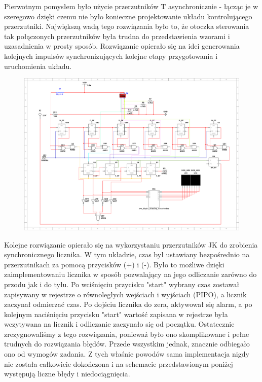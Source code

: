 \documentclass[a4paper]{article}
\begin{document}
Pierwotnym pomysłem było użycie przerzutników T asynchronicznie - łącząc je w szeregowo dzięki czemu 
nie było konieczne projektowanie układu kontrolującego przerzutniki. Największą wadą tego rozwiązania
było to, że otoczka sterowania tak połączonych przerzutników była trudna do przedstawienia wzorami i 
uzasadnienia w prosty sposób. Rozwiązanie opierało się na idei generowania kolejnych impulsów 
synchronizujących kolejne etapy przygotowania i uruchomienia układu.

\begin{figure}[H]
    \centering
    \includegraphics[width=\textwidth]{lab2_1.pdf}
\end{figure}
\pagebreak

Kolejne rozwiązanie opierało się na wykorzystaniu przerzutników JK do zrobienia synchronicznego licznika.
W tym układzie, czas był ustawiany bezpośrednio na przerzutnikach za pomocą przycisków (+) i (-). Było to możliwe
dzięki zaimplementowaniu licznika w sposób pozwalający na jego odliczanie zarówno do przodu jak i do tyłu.
Po wciśnięciu przycisku "start" wybrany czas zostawał zapisywany w rejestrze o równoległych wejściach i wyjściach (PIPO),
a licznik zaczynał odmierzać czas. Po dojściu licznika do zera, aktywował się alarm, a po kolejnym naciśnięciu
przycisku "start" wartość zapisana w rejestrze była wczytywana na licznik i odliczanie zaczynało się od początku.
Ostatecznie zrezygnowaliśmy z tego rozwiązania, ponieważ było ono skomplikowane i pełne trudnych do rozwiązania błędów.
Przede wszystkim jednak, znacznie odbiegało ono od wymogów zadania. Z tych właśnie powodów sama implementacja nigdy
nie została całkowicie dokończona i na schemacie przedstawionym poniżej występują liczne błędy i niedociągnięcia. 
\end{document}
